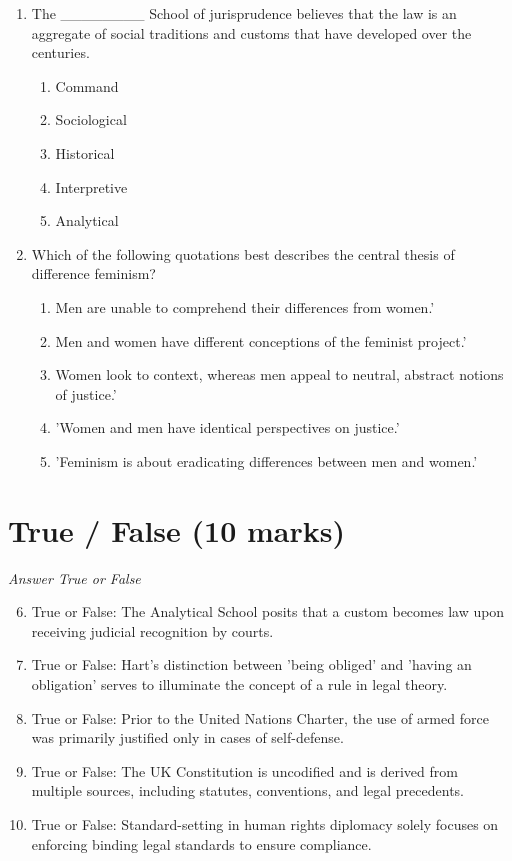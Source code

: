 \documentclass[12pt]{article}
\begin{document}
\begin{enumerate}[label=\arabic*.]
\begin{enumerate}[label=(\alph*)]
    \item A common carrier delivering a new computer.
\end{enumerate}
\item The \_\_\_\_\_\_\_\_ School of jurisprudence believes that the law is an aggregate of social traditions and customs that have developed over the centuries.
\begin{enumerate}[label=(\alph*)]
    \item Command
    \item Sociological
    \item Historical
    \item Interpretive
    \item Analytical
\end{enumerate}
\item Which of the following quotations best describes the central thesis of difference feminism?
\begin{enumerate}[label=(\alph*)]
    \item Men are unable to comprehend their differences from women.'
    \item Men and women have different conceptions of the feminist project.'
    \item Women look to context, whereas men appeal to neutral, abstract notions of justice.'
    \item 'Women and men have identical perspectives on justice.'
    \item 'Feminism is about eradicating differences between men and women.'
\end{enumerate}
\end{enumerate}

\section*{True / False (10 marks)}
\textit{Answer True or False}
\begin{enumerate}[label=\arabic*.]
\setcounter{enumi}{5}
\item True or False: The Analytical School posits that a custom becomes law upon receiving judicial recognition by courts.
\item True or False: Hart's distinction between 'being obliged' and 'having an obligation' serves to illuminate the concept of a rule in legal theory.
\item True or False: Prior to the United Nations Charter, the use of armed force was primarily justified only in cases of self-defense.
\item True or False: The UK Constitution is uncodified and is derived from multiple sources, including statutes, conventions, and legal precedents.
\item True or False: Standard-setting in human rights diplomacy solely focuses on enforcing binding legal standards to ensure compliance.
\end{enumerate}
\end{document}
